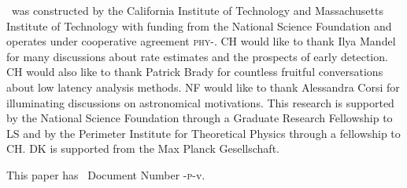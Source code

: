 \documentclass[preprint2]{aastex}
\begin{document}






\acknowledgements

\LIGO\ was constructed by the California Institute of Technology and
Massachusetts Institute of Technology with funding from the National Science
Foundation and operates under cooperative agreement
\textsc{phy}-.  CH would like to thank Ilya Mandel for
many discussions about rate estimates and the prospects of early detection.  CH
would also like to thank Patrick Brady for countless fruitful conversations
about low latency analysis methods.  NF would like to thank Alessandra Corsi
for illuminating discussions on astronomical motivations.  This research is
supported by the National Science Foundation through a Graduate Research
Fellowship to LS and by the Perimeter Institute for Theoretical Physics
through a fellowship to CH. DK is supported from the Max Planck Gesellschaft. 

This paper has \LIGO\ Document Number \LIGO-\textsc{p}-v.



\end{document}
